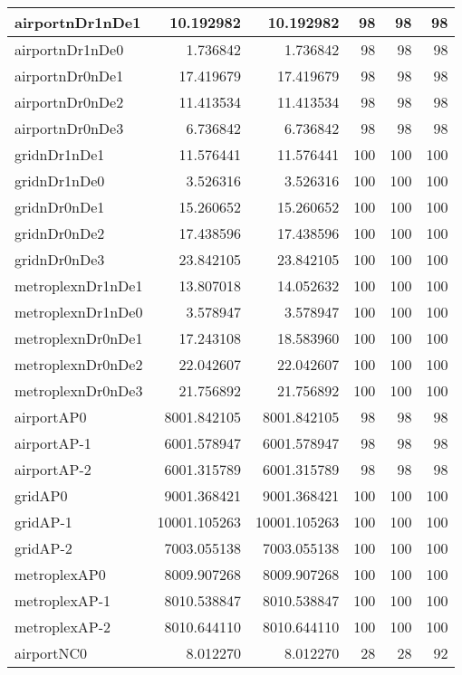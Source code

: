 \documentclass[../../../thesis.tex]{subfiles}
\begin{document}
\begin{longtable}{|l|r|r|r|r|r|}
\endlastfoot
airportnDr1nDe1 & 10.192982 & 10.192982 & 98 & 98 & 98 \\ \hline
airportnDr1nDe0 & 1.736842 & 1.736842 & 98 & 98 & 98 \\ \hline
airportnDr0nDe1 & 17.419679 & 17.419679 & 98 & 98 & 98 \\ \hline
airportnDr0nDe2 & 11.413534 & 11.413534 & 98 & 98 & 98 \\ \hline
airportnDr0nDe3 & 6.736842 & 6.736842 & 98 & 98 & 98 \\ \hline
gridnDr1nDe1 & 11.576441 & 11.576441 & 100 & 100 & 100 \\ \hline
gridnDr1nDe0 & 3.526316 & 3.526316 & 100 & 100 & 100 \\ \hline
gridnDr0nDe1 & 15.260652 & 15.260652 & 100 & 100 & 100 \\ \hline
gridnDr0nDe2 & 17.438596 & 17.438596 & 100 & 100 & 100 \\ \hline
gridnDr0nDe3 & 23.842105 & 23.842105 & 100 & 100 & 100 \\ \hline
metroplexnDr1nDe1 & 13.807018 & 14.052632 & 100 & 100 & 100 \\ \hline
metroplexnDr1nDe0 & 3.578947 & 3.578947 & 100 & 100 & 100 \\ \hline
metroplexnDr0nDe1 & 17.243108 & 18.583960 & 100 & 100 & 100 \\ \hline
metroplexnDr0nDe2 & 22.042607 & 22.042607 & 100 & 100 & 100 \\ \hline
metroplexnDr0nDe3 & 21.756892 & 21.756892 & 100 & 100 & 100 \\ \hline
airportAP0 & 8001.842105 & 8001.842105 & 98 & 98 & 98 \\ \hline
airportAP-1 & 6001.578947 & 6001.578947 & 98 & 98 & 98 \\ \hline
airportAP-2 & 6001.315789 & 6001.315789 & 98 & 98 & 98 \\ \hline
gridAP0 & 9001.368421 & 9001.368421 & 100 & 100 & 100 \\ \hline
gridAP-1 & 10001.105263 & 10001.105263 & 100 & 100 & 100 \\ \hline
gridAP-2 & 7003.055138 & 7003.055138 & 100 & 100 & 100 \\ \hline
metroplexAP0 & 8009.907268 & 8009.907268 & 100 & 100 & 100 \\ \hline
metroplexAP-1 & 8010.538847 & 8010.538847 & 100 & 100 & 100 \\ \hline
metroplexAP-2 & 8010.644110 & 8010.644110 & 100 & 100 & 100 \\ \hline
airportNC0 & 8.012270 & 8.012270 & 28 & 28 & 92 \\ \hline

\end{longtable}
\end{document}

